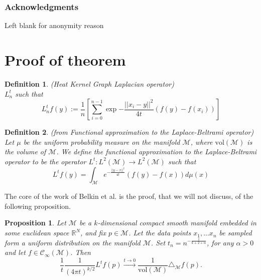 \documentclass{article} %
\newtheorem{definition}{Definition}[section]
\newtheorem{prop}{Proposition}
\begin{document}
\subsubsection*{Acknowledgments}
Left blank for anonymity reason




\newpage

{\LARGE {}}
\appendix

\section{Proof of theorem}


\begin{definition}{}(Heat Kernel Graph Laplacian operator)\\
	\label{def:Heat Kernel Graph Laplacian operator}
	$L_n^t$ such that
	$$L_n^tf(y) := \frac{1}{n}\left[ \sum_{i=0}^{n-1} \exp{-\frac{||x_i-y||^2}{4t}}\left(f(y)-f(x_i)\right)\right]$$
\end{definition}
\begin{definition}{}(from \cite[Belkin et al. ]{Belkin:2005:TTF:2138147.2138189}Functional approximation to the Laplace-Beltrami operator)\\ \label{eq: my L^t} Let $\mu$ be the uniform probability measure on the manifold $\mathcal M$, where $\text{vol}(\mathcal M)$ is the volume of $\mathcal M$. We define the functional approximation to the Laplace-Beltrami operator to be the operator $L^t: L^{2}(\mathcal{M}) \rightarrow L^{2}(\mathcal{M})$ such that
	\label{def:Functional approximation to the Laplace-Beltrami operator}
	$$ L^tf(y) = \int_{\mathcal M}e^{-\frac{||y-x||^2}{4t}}\left(f(y)-f(x)\right)d\mu(x)$$
\end{definition}

The core of the work of Belkin et al. is the proof, that we will not discuss, of the following proposition.

\begin{prop} 	Let $\mathcal M$ be a $k$-dimensional compact smooth manifold embedded in some euclidean space $\mathbb R^N$, and fix $p\in\mathcal M$. Let the data points $x_1, ... x_n$ be sampled form a uniform distribution on the manifold $\mathcal M$. Set $t_n=n^{-\frac{1}{k+2+\alpha}}$, for any $\alpha>0$ and let $f\in\mathcal C_\infty(\mathcal M)$. Then
	$$\frac{1}{t}\frac{1}{(4\pi t)^{k/2}} L^tf(p) \xrightarrow{t\to 0 } \frac{1}{\text{vol}(\mathcal M)}\triangle_{\mathcal M}f(p).$$
	\label{prop:3}
\end{prop}
\end{document}

